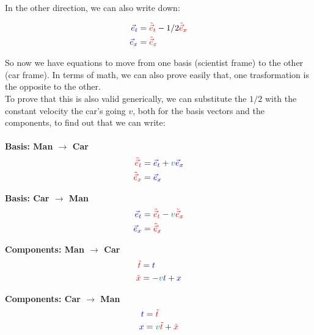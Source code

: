 In the other direction, we can also write down:

\begin{align*}
    \begingroup\color{blue}\vec{e}_t\endgroup &= \begingroup\color{red}\tilde{\vec{e}}_t\endgroup - 1/2 \begingroup\color{red}\tilde{\vec{e}}_x\endgroup\\
    \begingroup\color{blue}\vec{e}_x\endgroup &= \begingroup\color{red}\tilde{\vec{e}}_x\endgroup
\end{align*}

So now we have equations to move from one basis (scientist frame) to the other (car frame).
In terms of math, we can also prove easily that, one trasformation is the opposite to the other.\\

To prove that this is also valid generically, we can substitute the $1/2$ with the constant velocity the car's going $v$, both for the basis vectors and the 
components, to find out that we can write:\\ \\

\textbf{Basis: Man $\to$ Car}
\begin{align*}
    \begingroup\color{red}\tilde{\vec{e}}_t\endgroup &= \begingroup\color{blue}\vec{e}_t\endgroup + \begingroup\color{teal}v\endgroup \begingroup\color{blue}\vec{e}_x\endgroup \\
    \begingroup\color{red}\tilde{\vec{e}}_x\endgroup &= \begingroup\color{blue}\vec{e}_x\endgroup
\end{align*}

\textbf{Basis: Car $\to$ Man}
\begin{align*}
    \begingroup\color{blue}\vec{e}_t\endgroup &= \begingroup\color{red}\tilde{\vec{e}}_t\endgroup - \begingroup\color{teal}v\endgroup \begingroup\color{red}\tilde{\vec{e}}_x\endgroup\\
    \begingroup\color{blue}\vec{e}_x\endgroup &= \begingroup\color{red}\tilde{\vec{e}}_x\endgroup
\end{align*}

\textbf{Components: Man $\to$ Car}
\begin{align*}
    \begingroup\color{red}\tilde{t}\endgroup &= \begingroup\color{blue}t\endgroup\\
    \begingroup\color{red}\tilde{x}\endgroup &= -\begingroup\color{teal}v\endgroup \begingroup\color{blue}t\endgroup + \begingroup\color{blue}x\endgroup
\end{align*}

\textbf{Components: Car $\to$ Man}
\begin{align*}
    \begingroup\color{blue}t\endgroup &= \begingroup\color{red}\tilde{t}\endgroup\\
    \begingroup\color{blue}x\endgroup &= \begingroup\color{teal}v\endgroup \begingroup\color{red}\tilde{t}\endgroup + \begingroup\color{red}\tilde{x}\endgroup 
\end{align*}


